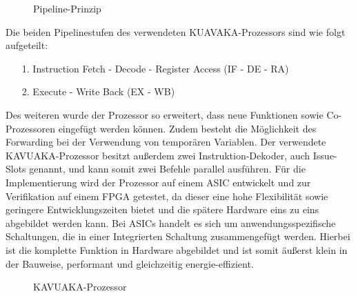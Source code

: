 \newpage
\begin{scriptsize}
	\begin{figure}[htbp] 
		\centering
		
		\caption{Pipeline-Prinzip}
		\label{fig:pipeline}
	\end{figure}
\end{scriptsize}

Die beiden Pipelinestufen des verwendeten KUAVAKA-Prozessors sind wie folgt aufgeteilt:
\begin{itemize}
	\item[1.] Instruction Fetch - Decode - Register Access (IF - DE - RA) 
	\item[2.] Execute - Write Back (EX - WB)
\end{itemize}

Des weiteren wurde der Prozessor so erweitert, dass neue Funktionen sowie Co-Prozessoren eingefügt werden können. Zudem besteht die Möglichkeit des Forwarding bei der Verwendung von temporären Variablen.
Der verwendete KAVUAKA-Prozessor besitzt außerdem zwei Instruktion-Dekoder, auch Issue-Slots genannt, und kann somit zwei Befehle parallel ausführen.
Für die Implementierung wird der Prozessor auf einem ASIC entwickelt und zur Verifikation auf einem FPGA getestet, da dieser eine hohe Flexibilität sowie geringere Entwicklungszeiten bietet und die spätere Hardware eins zu eins abgebildet werden kann.\cite{lukasglitches2017}
Bei ASICs handelt es sich um anwendungsspezifische Schaltungen, die in einer Integrierten Schaltung zusammengefügt werden. Hierbei ist die komplette Funktion in Hardware abgebildet und ist somit äußerst klein in der Bauweise, performant und gleichzeitig energie-effizient. 

\begin{scriptsize}
	\begin{figure}[htbp] 
		\centering
		
		\caption[KAVUAKA-Prozessor]{KAVUAKA-Prozessor \cite{lukasglitches2017}}
		\label{fig:KAVUAKA}
	\end{figure}
\end{scriptsize}
\newpage

